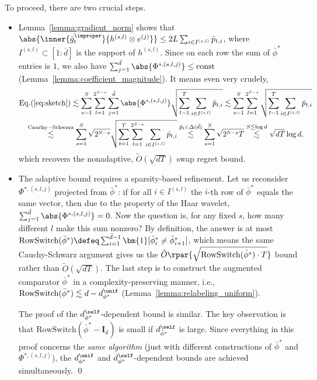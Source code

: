 \documentclass[10pt]{article}
\begin{document}
To proceed, there are two crucial steps. 
\begin{itemize}
\item Lemma~\ref{lemma:gradient_norm} shows that $\abs{\inner{\bar g_t^\improper}{h^{(s,l)}\otimes e^{(j)}}}\leq 2L\sum_{i\in I^{(s,l)}}\bar p_{t,i}$, where $I^{(s,l)}\subset[1:\bar d]$ is the support of $h^{(s,l)}$. Since on each row the sum of $\bar\phi^*$ entries is $1$, we also have $\sum_{j=1}^{\bar d}\abs{\Phi^{*,(s,l,j)}}\leq \mathrm{const}$ (Lemma~\ref{lemma:coefficient_magnitude}). It means even very crudely,
\begin{multline*}
\mathrm{Eq.(\ref{eq:sketch})}\lesssim \sum_{s=1}^S\sum_{l=1}^{2^{S-s}}\sum_{j=1}^{\bar d}\abs{\Phi^{*,(s,l,j)}}\sqrt{\sum_{t=1}^T\sum_{i\in I^{(s,l)}}\bar p_{t,i}}\lesssim \sum_{s=1}^S\sum_{l=1}^{2^{S-s}}\sqrt{\sum_{t=1}^T\sum_{i\in I^{(s,l)}}\bar p_{t,i}}\\
\overset{\mathrm{Cauchy-Schwarz}}{\lesssim} \sum_{s=1}^S\sqrt{2^{S-s}}\sqrt{\sum_{t=1}^T\sum_{l=1}^{2^{S-s}}\sum_{i\in I^{(s,l)}}\bar p_{t,i}}\overset{\bar p_t\in\Delta(\bar d)}{\lesssim} \sum_{s=1}^S\sqrt{2^{S-s}T}\overset{S\lesssim\log d}{\lesssim} \sqrt{dT}\log d,
\end{multline*}
which recovers the nonadaptive, $\tilde O(\sqrt{dT})$ swap regret bound. 
\item The adaptive bound requires a sparsity-based refinement. Let us reconsider $\Phi^{*,(s,l,j)}$ projected from $\bar\phi^*$: if for all $i\in I^{(s,l)}$ the $i$-th row of $\bar\phi^*$ equals the same vector, then due to the property of the Haar wavelet, $\sum_{j=1}^{\bar d}\abs{\Phi^{*,(s,l,j)}}=0$. Now the question is, for any fixed $s$, how many different $l$ make this sum nonzero? By definition, the answer is at most $\mathrm{RowSwitch}(\bar\phi^*)\defeq\sum_{i=1}^{\bar d-1}\bm{1}[\bar \phi^*_{i}\neq \bar \phi^*_{i+1}]$, which means the same Cauchy-Schwarz argument gives us the $\tilde O\rpar{\sqrt{\mathrm{RowSwitch}(\bar\phi^*)\cdot T}}$ bound rather than $\tilde O(\sqrt{dT})$. The last step is to construct the augmented comparator $\bar\phi^*$ in a complexity-preserving manner, i.e., $\mathrm{RowSwitch}(\bar\phi^*)\lesssim d-d^\unif_{\phi^*}$ (Lemma~\ref{lemma:relabeling_uniform}). 

The proof of the $d^\self_{\phi^*}$-dependent bound is similar. The key observation is that $\mathrm{RowSwitch}(\bar\phi^*-\bm{I}_{\bar d})$ is small if $d^\self_{\bar \phi^*}$ is large. Since everything in this proof concerns the \emph{same algorithm} (just with different constructions of $\bar\phi^*$ and $\Phi^{*,(s,l,j)}$), the $d^\unif_{\phi^*}$ and $d^\self_{\phi^*}$-dependent bounds are achieved simultaneously. \qed
\end{itemize}
\end{document}

